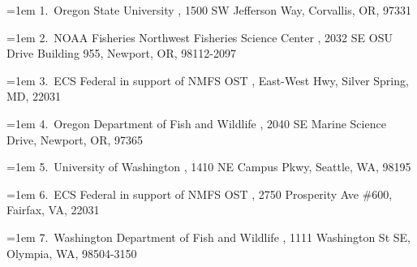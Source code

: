 \documentclass[
]{scrartcl}
\begin{document}
\begin{titlepage}
\begin{minipage}[b][\textheight][s]{\textwidth}

  \vspace{2\baselineskip}

  \hangindent=1em
  {1}.~{Oregon State University}%
  , %
  {1500 SW Jefferson Way, Corvallis, OR, 97331}%
  \par\hangindent=1em%
  {2}.~{NOAA Fisheries Northwest Fisheries Science Center}%
  , %
  {2032 SE OSU Drive Building 955, Newport, OR, 98112-2097}%
  \par\hangindent=1em%
  {3}.~{ECS Federal in support of NMFS OST}%
  , %
  {East-West Hwy, Silver Spring, MD, 22031}%
  \par\hangindent=1em%
  {4}.~{Oregon Department of Fish and Wildlife}%
  , %
  {2040 SE Marine Science Drive, Newport, OR, 97365}%
  \par\hangindent=1em%
  {5}.~{University of Washington}%
  , %
  {1410 NE Campus Pkwy, Seattle, WA, 98195}%
  \par\hangindent=1em%
  {6}.~{ECS Federal in support of NMFS OST}%
  , %
  {2750 Prosperity Ave \#600, Fairfax, VA, 22031}%
  \par\hangindent=1em%
  {7}.~{Washington Department of Fish and Wildlife}%
  , %
  {1111 Washington St SE, Olympia, WA, 98504-3150}%


  \vspace{1\baselineskip}



  \vfill


  \vspace{1\baselineskip}


\end{minipage}
\end{titlepage}
\end{document}
